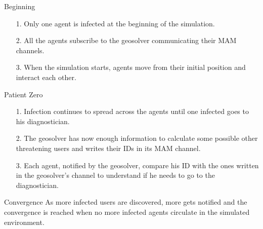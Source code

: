 \begin{block}{Beginning}
    \begin{itemize}
        \item[1.] Only one agent is infected at the beginning of the simulation.
        \item[2.] All the agents subscribe to the geosolver communicating their MAM channels.
        \item[3.] When the simulation starts, agents move from their initial position and interact each other.
    \end{itemize}
\end{block}

\begin{block}{Patient Zero}
    \begin{itemize}
        \item[1.] Infection continues to spread across the agents until one infected goes to his diagnostician.
        \item[2.] The geosolver has now enough information to calculate some possible other threatening users and writes their IDs in its MAM channel.
        \item[3.] Each agent, notified by the geosolver, compare his ID with the ones written in the geosolver's channel to understand if he needs to go to the diagnostician.
    \end{itemize}
\end{block}

\begin{block}{Convergence}
    As more infected users are discovered, more gets notified and the convergence is reached when no more infected agents circulate in the simulated environment.
\end{block}